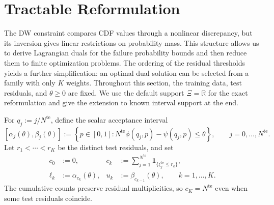 \section{Tractable Reformulation}
\label{sec-reformulation}

The DW constraint compares CDF values through a nonlinear discrepancy, but its inversion gives linear restrictions on probability mass. This structure allows us to derive Lagrangian duals for the failure probability bounds and then reduce them to finite optimization problems. The ordering of the residual thresholds yields a further simplification: an optimal dual solution can be selected from a family with only $K$ weights. Throughout this section, the training data, test residuals, and $\theta\ge0$ are fixed. We use the default support $\Xi=\mathbb R$ for the exact reformulation and give the extension to known interval support at the end.

For $q_j:=j/N^{\mathrm{te}}$, define the scalar acceptance interval
\begin{equation}
  \left[\alpha_j(\theta),\beta_j(\theta)\right]
  :=\left\{p\in\left[0,1\right]:
  N^{\mathrm{te}}\phi\left(q_j,p\right)-\psi\left(q_j,p\right)\le\theta\right\},
  \qquad j=0,\ldots,N^{\mathrm{te}}.
  \label{eq-dw-rank-acceptance}
\end{equation}
Let $r_1<\cdots<r_K$ be the distinct test residuals, and set
\begin{equation}
  \begin{aligned}
    c_0&:=0,&
    c_k&:=\sum_{j=1}^{N^{\mathrm{te}}}\mathbf1_{\{\xi_j^{\mathrm{te}}\le r_k\}},\\
    \ell_k&:=\alpha_{c_k}(\theta),&
    u_k&:=\beta_{c_{k-1}}(\theta),\qquad k=1,\ldots,K.
  \end{aligned}
  \label{eq-dw-counts-and-levels}
\end{equation}
The cumulative counts preserve residual multiplicities, so $c_K=N^{\mathrm{te}}$ even when some test residuals coincide.

